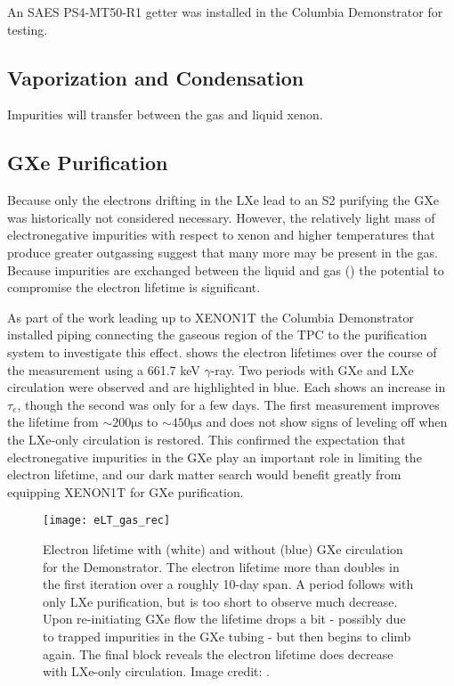 An SAES PS4-MT50-R1 getter was installed in the Columbia Demonstrator for testing.



\subsection{Vaporization and Condensation}
\label{subsec:electron_lifetime_model_vap_and_cond}
Impurities will transfer between the gas and liquid xenon.



\subsection{GXe Purification}
\label{subsec:electron_lifetime_model_gxe}
Because only the electrons drifting in the LXe lead to an S2 purifying the GXe was historically not considered necessary.  However,
the relatively light mass of electronegative impurities with respect to xenon and higher temperatures that produce greater outgassing
suggest that many more may be present in the gas.  Because
impurities are exchanged between the liquid and gas () the potential to compromise
the electron lifetime is significant.

As part of the work leading up to XENON1T the Columbia Demonstrator installed piping connecting the gaseous region of the TPC to the
purification system to investigate this effect.   shows the electron lifetimes over
the course of the measurement using a  661.7 keV $\gamma$-ray.  Two periods with GXe and LXe circulation were observed and
are highlighted in blue.  Each shows an increase in
$\tau_e$, though the second was only for a few days.  The first measurement improves the lifetime from
${\sim} 200 \mathrm{\mu s}$ to ${\sim} 450 \mathrm{\mu s}$ and does not show signs of leveling off when the LXe-only circulation is
restored.  This confirmed the expectation that electronegative impurities in the GXe play an important role in limiting the electron
lifetime, and our dark matter search would benefit greatly from equipping XENON1T for GXe purification.

\begin{figure}
\centering
\texttt{[image: eLT\_gas\_rec]}
\caption{Electron lifetime with (white) and without (blue) GXe circulation for the Demonstrator.  The electron lifetime more than doubles
in the first iteration over a roughly 10-day span.  A period follows with
only LXe purification, but is too short to observe much decrease.  Upon re-initiating GXe flow the lifetime drops a bit - possibly due to
trapped impurities in the GXe tubing - but then begins to climb again.  The final block reveals the electron lifetime does
decrease with LXe-only circulation.  Image credit: .}
\label{fig:electron_lifetime_model_gxe_demonstrator}
\end{figure}

